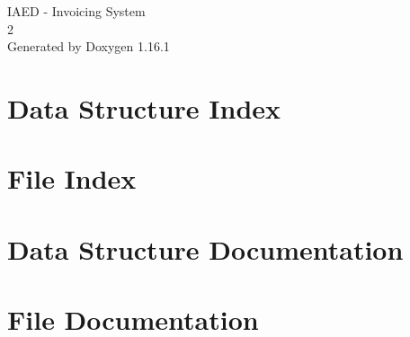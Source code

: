 \documentclass[twoside]{book}
\newcommand{\+}{\discretionary{\mbox{\scriptsize$\hookleftarrow$}}{}{}}
\newcommand{\clearemptydoublepage}{%
    \newpage{\pagestyle{empty}\cleardoublepage}%
  }
\begin{document}
  \raggedbottom
    \hypersetup{pageanchor=false,
                bookmarksnumbered=true,
                pdfencoding=unicode
               }
  \begin{titlepage}
  \vspace*{7cm}
  \begin{center}%
  {\Large IAED -\/ Invoicing System}\\
  [1ex]\large 2 \\
  \vspace*{1cm}
  {\large Generated by Doxygen 1.16.1}\\
  \end{center}
  \end{titlepage}
  \clearemptydoublepage
  \tableofcontents
  \clearemptydoublepage
  \hypersetup{pageanchor=true}

\chapter{Data Structure Index}

\chapter{File Index}

\chapter{Data Structure Documentation}











\chapter{File Documentation}








































  \backmatter
  \newpage
  \clearemptydoublepage
  \printindex
\end{document}
